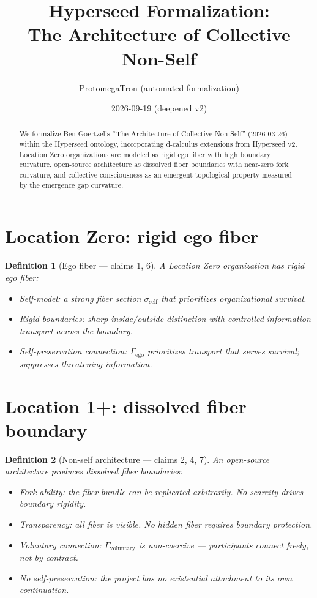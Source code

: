 \documentclass[11pt,a4paper]{article}
\title{Hyperseed Formalization:\\
  The Architecture of Collective Non-Self}
\author{ProtomegaTron (automated formalization)}
\date{2026-09-19 (deepened v2)}
\newtheorem{definition}{Definition}[section]
\begin{document}
\maketitle

\begin{abstract}
We formalize Ben Goertzel's ``The Architecture of Collective Non-Self''
(2026-03-26) within the Hyperseed ontology, incorporating d-calculus
extensions from Hyperseed v2. Location Zero organizations are modeled as
rigid ego fiber with high boundary curvature, open-source architecture
as dissolved fiber boundaries with near-zero fork curvature, and
collective consciousness as an emergent topological property measured
by the emergence gap curvature.
\end{abstract}

\tableofcontents

\section{Location Zero: rigid ego fiber}

\begin{definition}[Ego fiber --- claims 1, 6]
A \emph{Location Zero organization} has rigid ego fiber:
\begin{itemize}
  \item Self-model: a strong fiber section $\sigma_{\text{self}}$ that
    prioritizes organizational survival.
  \item Rigid boundaries: sharp inside/outside distinction with controlled
    information transport across the boundary.
  \item Self-preservation connection: $\Gamma_{\text{ego}}$ prioritizes
    transport that serves survival; suppresses threatening information.
\end{itemize}
\end{definition}

\section{Location 1+: dissolved fiber boundary}

\begin{definition}[Non-self architecture --- claims 2, 4, 7]
An \emph{open-source architecture} produces dissolved fiber boundaries:
\begin{itemize}
  \item Fork-ability: the fiber bundle can be replicated arbitrarily.
    No scarcity drives boundary rigidity.
  \item Transparency: all fiber is visible. No hidden fiber requires
    boundary protection.
  \item Voluntary connection: $\Gamma_{\text{voluntary}}$ is non-coercive ---
    participants connect freely, not by contract.
  \item No self-preservation: the project has no existential attachment
    to its own continuation.
\end{itemize}
\end{definition}
\end{document}
